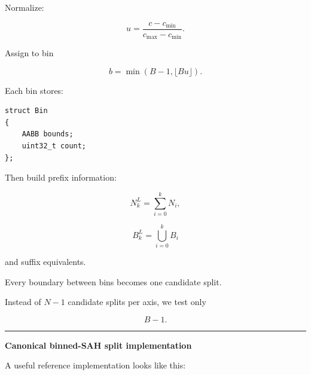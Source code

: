 Normalize:

\[
u=
\frac{c-c_{\min}}
{c_{\max}-c_{\min}}.
\]

Assign to bin

\[
b=
\min(
B-1,
\lfloor Bu\rfloor
).
\]

Each bin stores:

\begin{verbatim}
struct Bin
{
    AABB bounds;
    uint32_t count;
};
\end{verbatim}

Then build prefix information:

\[
N^L_k
=
\sum_{i=0}^{k}N_i,
\]

\[
B^L_k
=
\bigcup_{i=0}^{k}B_i
\]

and suffix equivalents.

Every boundary between bins becomes one candidate split.

Instead of \(N-1\) candidate splits per axis, we test only

\[
B-1.
\]

\begin{center}\rule{0.5\linewidth}{0.5pt}\end{center}

\textbf{Canonical binned-SAH split implementation}

A useful reference implementation looks like this:

